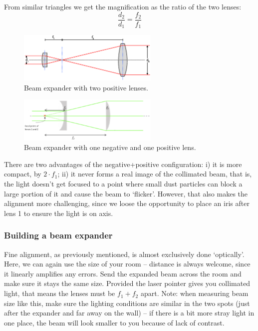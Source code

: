 \documentclass[a4paper]{report}
\begin{document}
	From similar triangles we get the magnification as the ratio of the two lenses:
	\begin{equation}
	\frac{d_2}{d_1}=\frac{f_2}{f_1}
	\label{eq:beamExp}
	\end{equation}
	
	\begin{figure}[h!]
		\center
		\includegraphics[width=0.6\textwidth]{beamExpander1.eps}
		\caption{Beam expander with two positive lenses.}
		\label{beamExpander1}
	\end{figure}
	
	\begin{figure}[h!]
		\center
		\includegraphics[width=0.6\textwidth]{beamExpander2.eps}
		\caption{Beam expander with one negative and one positive lens.}
		\label{beamExpander2}
	\end{figure}
	
	There are two advantages of the negative+positive configuration: i) it is more compact, by $2\cdot f_1$; ii) it never forms a real image of the collimated beam, that is, the light doesn't get focused to a point where small dust particles can block a large portion of it and cause the beam to `flicker'. However, that also makes the alignment more challenging, since we loose the opportunity to place an iris after lens 1 to ensure the light is on axis.

	
	\subsubsection{Building a beam expander}
	Fine alignment, as previously mentioned, is almost exclusively done `optically'. Here, we can again use the size of your room -- distance is always welcome, since it linearly amplifies any errors. Send the expanded beam across the room and make sure it stays the same size. Provided the laser pointer gives you collimated light, that means the lenses must be $f_1+f_2$ apart. Note: when measuring beam size like this, make sure the lighting conditions are similar in the two spots (just after the expander and far away on the wall) -- if there is a bit more stray light in one place, the beam will look smaller to you because of lack of contrast.
\end{document}
